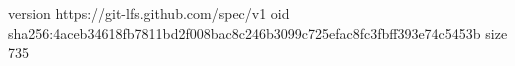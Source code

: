 version https://git-lfs.github.com/spec/v1
oid sha256:4aceb34618fb7811bd2f008bac8c246b3099c725efac8fc3fbff393e74c5453b
size 735
